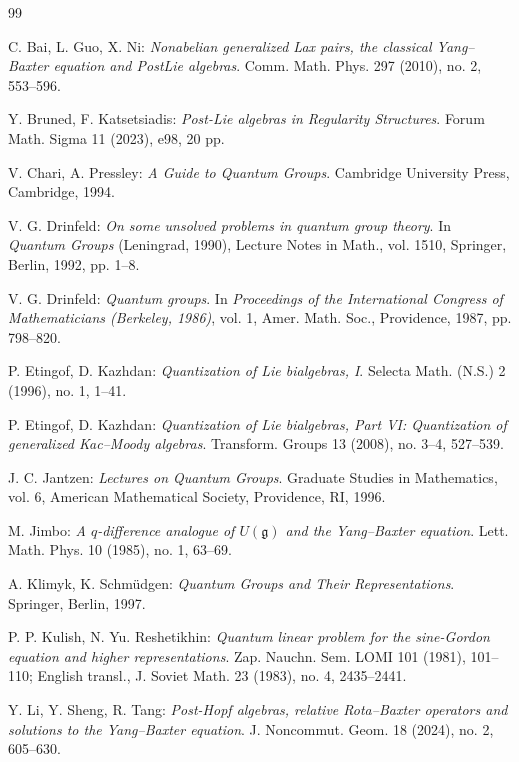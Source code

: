 \documentclass[11pt,english]{article}
\theoremstyle{definition}
\begin{document}
\begin{thebibliography}{99}


C. Bai, L. Guo, X. Ni:
\emph{Nonabelian generalized Lax pairs, the classical
Yang--Baxter equation and PostLie algebras}.
Comm. Math. Phys. 297 (2010), no. 2, 553--596.

Y. Bruned, F. Katsetsiadis:
\emph{Post-Lie algebras in Regularity Structures}.
Forum Math. Sigma 11 (2023), e98, 20 pp.

V. Chari, A. Pressley:
\emph{A Guide to Quantum Groups}.
Cambridge University Press, Cambridge, 1994.

V. G. Drinfeld:
\emph{On some unsolved problems in quantum group theory}.
In \emph{Quantum Groups} (Leningrad, 1990),
Lecture Notes in Math., vol. 1510,
Springer, Berlin, 1992, pp. 1--8.

V. G. Drinfeld:
\emph{Quantum groups}.
In \emph{Proceedings of the International Congress
of Mathematicians (Berkeley, 1986)},
vol. 1, Amer. Math. Soc., Providence, 1987,
pp. 798--820.

P. Etingof, D. Kazhdan:
\emph{Quantization of Lie bialgebras, I}.
Selecta Math. (N.S.) 2 (1996), no. 1, 1--41.

P. Etingof, D. Kazhdan:
\emph{Quantization of Lie bialgebras, Part VI:
Quantization of generalized Kac--Moody algebras}.
Transform. Groups 13 (2008), no. 3--4, 527--539.

J. C. Jantzen:
\emph{Lectures on Quantum Groups}.
Graduate Studies in Mathematics, vol. 6,
American Mathematical Society, Providence, RI, 1996.

M. Jimbo:
\emph{A $q$-difference analogue of $U(\mathfrak g)$
and the Yang--Baxter equation}.
Lett. Math. Phys. 10 (1985), no. 1, 63--69.

A. Klimyk, K. Schm\"udgen:
\emph{Quantum Groups and Their Representations}.
Springer, Berlin, 1997.

P. P. Kulish, N. Yu. Reshetikhin:
\emph{Quantum linear problem for the sine-Gordon equation
and higher representations}.
Zap. Nauchn. Sem. LOMI 101 (1981), 101--110;
English transl., J. Soviet Math. 23 (1983),
no. 4, 2435--2441.

Y. Li, Y. Sheng, R. Tang:
\emph{Post-Hopf algebras, relative Rota--Baxter operators
and solutions to the Yang--Baxter equation}.
J. Noncommut. Geom. 18 (2024), no. 2, 605--630.


\end{thebibliography}
\end{document}
